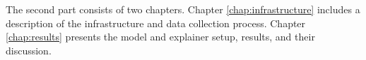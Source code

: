 The second part consists of two chapters. Chapter \ref{chap:infrastructure} includes a description of the infrastructure and data collection process. Chapter \ref{chap:results} presents the model and explainer setup, results, and their discussion.













